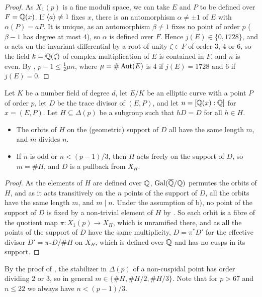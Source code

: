 \begin{proof}
As $X_1(p)$ is a fine moduli space, we can take $E$ and $P$ to be defined over $F=\mathbb{Q}(x)$. If $\langle a\rangle\neq 1$ fixes $x$, there is an automorphism $\alpha\neq\pm1$ of $E$ with $\alpha(P)=aP$. It is unique, as an automorphism $\beta\neq1$ fixes no point of order $p$ ($\beta-1$ has degree at most $4$), so $\alpha$ is defined over $F$. Hence $j(E)\in\{0,1728\}$, and $\alpha$ acts on the invariant differential by a root of unity $\zeta\in F$ of order $3$, $4$ or $6$, so the field $k=\mathbb{Q}(\zeta)$ of complex multiplication of $E$ is contained in $F$, and $n$ is even. By , $p-1\leq\tfrac12\mu n$, where $\mu=\#\operatorname{Aut}(E)$ is $4$ if $j(E)=1728$ and $6$ if $j(E)=0$.
\end{proof}

\begin{lemma}\label{lem:orbits}
Let $K$ be a number field of degree $d$, let $E/K$ be an elliptic curve with a point $P$ of order $p$, let $D$ be the trace divisor of $(E,P)$, and let $n=[\mathbb{Q}(x):\mathbb{Q}]$ for $x=(E,P)$. Let $H\subseteq\Delta(p)$ be a subgroup such that $hD=D$ for all $h\in H$.
\begin{itemize}
\item[a)] The orbits of $H$ on the (geometric) support of $D$ all have the same length $m$, and $m$ divides $n$.
\item[b)] If $n$ is odd or $n<(p-1)/3$, then $H$ acts freely on the support of $D$, so $m=\#H$, and $D$ is a pullback from $X_H$.
\end{itemize}
\end{lemma}

\begin{proof}
As the elements of $H$ are defined over $\mathbb{Q}$, $\operatorname{Gal}(\overline{\mathbb{Q}}/\mathbb{Q})$ permutes the orbits of $H$, and as it acts transitively on the $n$ points of the support of $D$, all the orbits have the same length $m$, and $m\mid n$. Under the assumption of b), no point of the support of $D$ is fixed by a non-trivial element of $H$ by . So each orbit is a fibre of the quotient map $\pi:X_1(p)\to X_H$, which is unramified there, and as all the points of the support of $D$ have the same multiplicity, $D=\pi^*D'$ for the effective divisor $D'=\pi_*D/\#H$ on $X_H$, which is defined over $\mathbb{Q}$ and has no cusps in its support.
\end{proof}

By the proof of , the stabilizer in $\Delta(p)$ of a non-cuspidal point has order dividing $2$ or $3$, so in general $m\in\{\#H,\#H/2,\#H/3\}$. Note that for $p>67$ and $n\leq 22$ we always have $n<(p-1)/3$.

